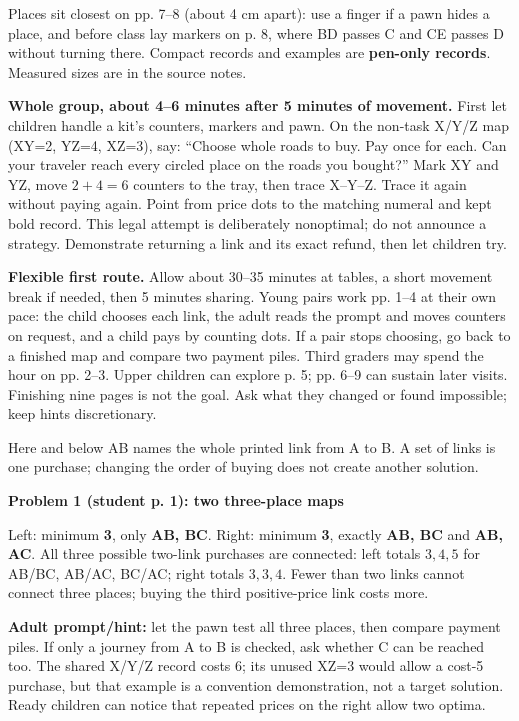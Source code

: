 \documentclass[11pt,letterpaper]{article}
\newcommand\topic[1]{\par\vspace{5pt}{\large\bfseries #1}\par}
\newcommand\task[2]{\par\vspace{3pt}\textbf{Problem #1 (student p. #1): #2}\par}
\begin{document}
Places sit closest on pp. 7--8 (about 4 cm apart): use a finger if a pawn hides a place, and before class lay markers on p. 8, where BD passes C and CE passes D without turning there. Compact records and examples are \textbf{pen-only records}. Measured sizes are in the source notes.

\textbf{Whole group, about 4--6 minutes after 5 minutes of movement.} First let children handle a kit's counters, markers and pawn. On the non-task X/Y/Z map (XY=2, YZ=4, XZ=3), say: ``Choose whole roads to buy. Pay once for each. Can your traveler reach every circled place on the roads you bought?'' Mark XY and YZ, move $2+4=6$ counters to the tray, then trace X--Y--Z. Trace it again without paying again. Point from price dots to the matching numeral and kept bold record. This legal attempt is deliberately nonoptimal; do not announce a strategy. Demonstrate returning a link and its exact refund, then let children try.

\textbf{Flexible first route.} Allow about 30--35 minutes at tables, a short movement break if needed, then 5 minutes sharing. Young pairs work pp. 1--4 at their own pace: the child chooses each link, the adult reads the prompt and moves counters on request, and a child pays by counting dots. If a pair stops choosing, go back to a finished map and compare two payment piles. Third graders may spend the hour on pp. 2--3. Upper children can explore p. 5; pp. 6--9 can sustain later visits. Finishing nine pages is not the goal. Ask what they changed or found impossible; keep hints discretionary.
\newpage

\topic{Complete small-map keys: Problems 1--4}
Here and below AB names the whole printed link from A to B. A set of links is one purchase; changing the order of buying does not create another solution.

\task{1}{two three-place maps}
Left: minimum \textbf{3}, only \textbf{AB, BC}. Right: minimum \textbf{3}, exactly \textbf{AB, BC} and \textbf{AB, AC}. All three possible two-link purchases are connected: left totals $3,4,5$ for AB/BC, AB/AC, BC/AC; right totals $3,3,4$. Fewer than two links cannot connect three places; buying the third positive-price link costs more.

\textbf{Adult prompt/hint:} let the pawn test all three places, then compare payment piles. If only a journey from A to B is checked, ask whether C can be reached too. The shared X/Y/Z record costs 6; its unused XZ=3 would allow a cost-5 purchase, but that example is a convention demonstration, not a target solution. Ready children can notice that repeated prices on the right allow two optima.
\end{document}
